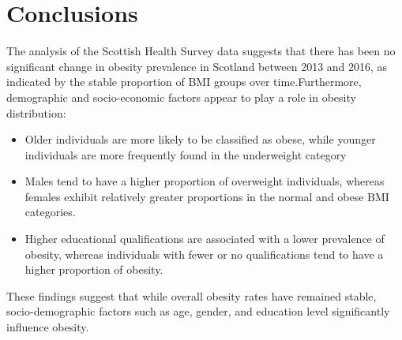 \documentclass[
  letterpaper,
  DIV=11,
  numbers=noendperiod]{scrartcl}
\begin{document}
\hypertarget{sec-conc}{%
\section{Conclusions}\label{sec-conc}}

The analysis of the Scottish Health Survey data suggests that there has
been no significant change in obesity prevalence in Scotland between
2013 and 2016, as indicated by the stable proportion of BMI groups over
time.Furthermore, demographic and socio-economic factors appear to play
a role in obesity distribution:

\begin{itemize}
\item
  Older individuals are more likely to be classified as obese, while
  younger individuals are more frequently found in the underweight
  category
\item
  Males tend to have a higher proportion of overweight individuals,
  whereas females exhibit relatively greater proportions in the normal
  and obese BMI categories.
\item
  Higher educational qualifications are associated with a lower
  prevalence of obesity, whereas individuals with fewer or no
  qualifications tend to have a higher proportion of obesity.
\end{itemize}

These findings suggest that while overall obesity rates have remained
stable, socio-demographic factors such as age, gender, and education
level significantly influence obesity.
\end{document}
